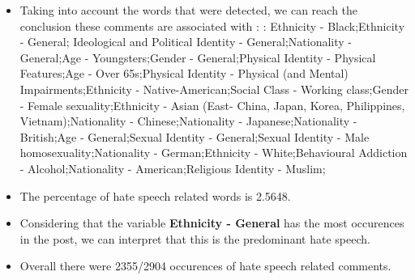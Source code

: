 \documentclass[11pt]{article}
\begin{document}
\begin{itemize}\item Taking into account the words that were detected, we can reach the conclusion these comments are associated with : : Ethnicity - Black;Ethnicity - General; Ideological and Political Identity - General;Nationality - General;Age - Youngsters;Gender - General;Physical Identity - Physical Features;Age - Over 65s;Physical Identity - Physical (and Mental) Impairments;Ethnicity - Native-American;Social Class - Working class;Gender - Female sexuality;Ethnicity - Asian (East- China, Japan, Korea, Philippines, Vietnam);Nationality - Chinese;Nationality - Japanese;Nationality - British;Age - General;Sexual Identity - General;Sexual Identity - Male homosexuality;Nationality - German;Ethnicity - White;Behavioural Addiction - Alcohol;Nationality - American;Religious Identity - Muslim;%

\item The percentage of hate speech related words is 2.5648.

\item Considering that the variable \textbf{Ethnicity - General} has the most occurences in the post, we can interpret that this is the predominant hate speech.

\item Overall there were 2355/2904 occurences of hate speech related comments.\end{itemize}
\end{document}
